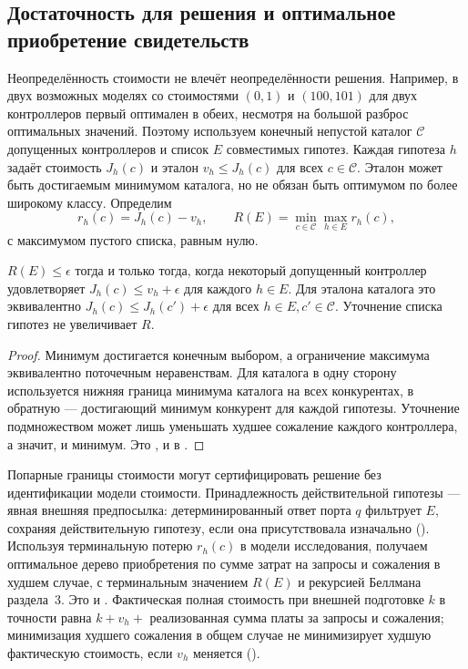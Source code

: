 \subsection{Достаточность для решения и оптимальное приобретение свидетельств}
Неопределённость стоимости не влечёт неопределённости решения. Например, в двух возможных моделях со стоимостями $(0,1)$ и $(100,101)$ для двух контроллеров первый оптимален в обеих, несмотря на большой разброс оптимальных значений. Поэтому используем конечный непустой каталог $\mathcal C$ допущенных контроллеров и список $E$ совместимых гипотез. Каждая гипотеза $h$ задаёт стоимость $J_h(c)$ и эталон $v_h\le J_h(c)$ для всех $c\in\mathcal C$. Эталон может быть достигаемым минимумом каталога, но не обязан быть оптимумом по более широкому классу. Определим
\[
 r_h(c)=J_h(c)-v_h,\qquad R(E)=\min_{c\in\mathcal C}\max_{h\in E}r_h(c),
\]
с максимумом пустого списка, равным нулю.
\begin{theorem}\label{thm:decision}
$R(E)\le\epsilon$ тогда и только тогда, когда некоторый допущенный контроллер удовлетворяет $J_h(c)\le v_h+\epsilon$ для каждого $h\in E$. Для эталона каталога это эквивалентно $J_h(c)\le J_h(c')+\epsilon$ для всех $h\in E,c'\in\mathcal C$. Уточнение списка гипотез не увеличивает $R$.
\end{theorem}
\begin{proof}
Минимум достигается конечным выбором, а ограничение максимума эквивалентно поточечным неравенствам. Для каталога в одну сторону используется нижняя граница минимума каталога на всех конкурентах, в обратную --- достигающий минимум конкурент для каждой гипотезы. Уточнение подмножеством может лишь уменьшать худшее сожаление каждого контроллера, а значит, и минимум. Это ,  и  в .
\end{proof}
Попарные границы стоимости могут сертифицировать решение без идентификации модели стоимости. Принадлежность действительной гипотезы --- явная внешняя предпосылка: детерминированный ответ порта $q$ фильтрует $E$, сохраняя действительную гипотезу, если она присутствовала изначально (). Используя терминальную потерю $r_h(c)$ в модели исследования, получаем оптимальное дерево приобретения по сумме затрат на запросы и сожаления в худшем случае, с терминальным значением $R(E)$ и рекурсией Беллмана раздела~3. Это  и . Фактическая полная стоимость при внешней подготовке $k$ в точности равна $k+v_h+$ реализованная сумма платы за запросы и сожаления; минимизация худшего сожаления в общем случае не минимизирует худшую фактическую стоимость, если $v_h$ меняется ().


